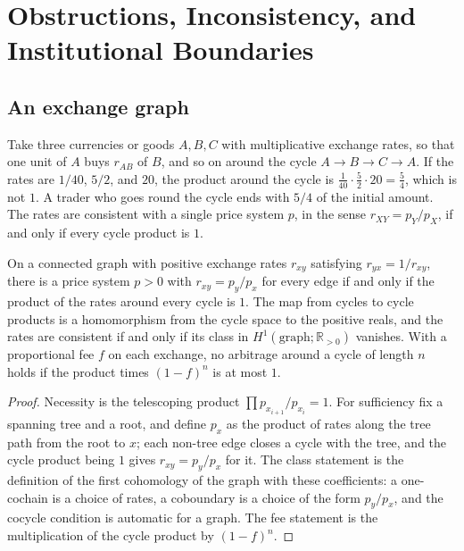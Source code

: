 \chapter{Obstructions, Inconsistency, and Institutional Boundaries}\label{ch:59}

\section{An exchange graph}

Take three currencies or goods $A,B,C$ with multiplicative exchange rates, so that one unit of $A$ buys $r_{AB}$ of $B$, and so on around the cycle $A\to B\to C\to A$. If the rates are $1/40$, $5/2$, and $20$, the product around the cycle is $\tfrac1{40}\cdot\tfrac52\cdot 20=\tfrac54$, which is not $1$. A trader who goes round the cycle ends with $5/4$ of the initial amount. The rates are consistent with a single price system $p$, in the sense $r_{XY}=p_Y/p_X$, if and only if every cycle product is $1$.

\begin{proposition}\label{prop:P22}
On a connected graph with positive exchange rates $r_{xy}$ satisfying $r_{yx}=1/r_{xy}$, there is a price system $p>0$ with $r_{xy}=p_y/p_x$ for every edge if and only if the product of the rates around every cycle is $1$. The map from cycles to cycle products is a homomorphism from the cycle space to the positive reals, and the rates are consistent if and only if its class in $H^1(\text{graph};\mathbb R_{>0})$ vanishes. With a proportional fee $f$ on each exchange, no arbitrage around a cycle of length $n$ holds if the product times $(1-f)^n$ is at most $1$.
\end{proposition}

\begin{proof}
Necessity is the telescoping product $\prod p_{x_{i+1}}/p_{x_i}=1$. For sufficiency fix a spanning tree and a root, and define $p_x$ as the product of rates along the tree path from the root to $x$; each non-tree edge closes a cycle with the tree, and the cycle product being $1$ gives $r_{xy}=p_y/p_x$ for it. The class statement is the definition of the first cohomology of the graph with these coefficients: a one-cochain is a choice of rates, a coboundary is a choice of the form $p_y/p_x$, and the cocycle condition is automatic for a graph. The fee statement is the multiplication of the cycle product by $(1-f)^n$.
\end{proof}

